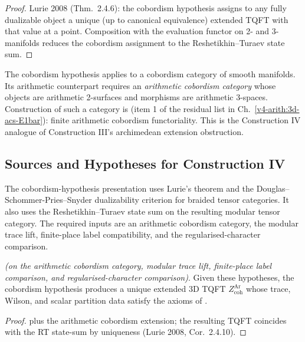 \begin{proof}
Lurie 2008 (Thm.~2.4.6): the cobordism hypothesis assigns to any
fully dualizable object a unique (up to canonical equivalence)
extended TQFT with that value at a point. Composition with the
evaluation functor on 2- and 3-manifolds reduces the cobordism
assignment to the Reshetikhin--Turaev state sum.
\end{proof}

\begin{remark}
\label{v4-arith:w10-a:rem:arith-cobord}
The cobordism hypothesis applies to a cobordism category
of smooth manifolds. Its arithmetic counterpart requires an
\emph{arithmetic cobordism category} whose objects are
arithmetic 2-surfaces and morphisms are arithmetic 3-spaces.
Construction of such a category is 
(item 1 of the residual list in Ch.~\ref{v4-arith:3d-acs-E1bar}):
finite arithmetic cobordism functoriality. This is the Construction IV
analogue of Construction III's archimedean extension obstruction.
\end{remark}

\subsection{Sources and Hypotheses for Construction IV}
\label{v4-arith:w10-a:ah:construction-IV}

The cobordism-hypothesis presentation uses Lurie's theorem and the
Douglas--Schommer-Pries--Snyder dualizability criterion for braided
tensor categories. It also uses the Reshetikhin--Turaev state sum on
the resulting modular tensor category. The required inputs are an
arithmetic cobordism category, the modular trace lift, finite-place
label compatibility, and the regularised-character comparison.

\begin{theorem}
\label{v4-arith:w10-a:thm:construction-IV-closure}
\ClaimStatusProvedHereConditional \emph{(on the arithmetic cobordism
category, modular trace lift, finite-place label comparison, and
regularised-character comparison)}. Given these hypotheses, the
cobordism hypothesis produces a unique extended 3D TQFT
\(Z_{\mathrm{coh}}^{\mathrm{Ar}}\) whose trace, Wilson, and scalar
partition data satisfy the axioms of
.
\end{theorem}

\begin{proof}
 plus the arithmetic
cobordism extension; the resulting TQFT coincides with the RT
state-sum by uniqueness (Lurie 2008, Cor.~2.4.10).
\end{proof}

